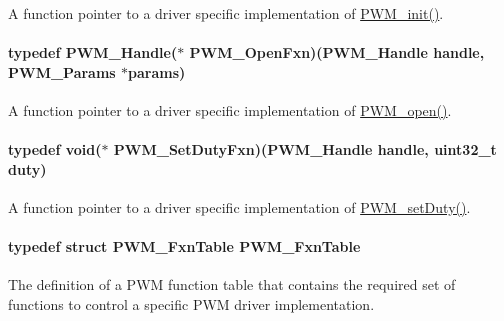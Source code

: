 A function pointer to a driver specific implementation of \hyperlink{_p_w_m_8h_aadae3fe77e36cbf9643a22eeb99fb01e}{P\-W\-M\-\_\-init()}. 

\paragraph[{P\-W\-M\-\_\-\-Open\-Fxn}]{\setlength{\rightskip}{0pt plus 5cm}typedef {\bf P\-W\-M\-\_\-\-Handle}($\ast$ P\-W\-M\-\_\-\-Open\-Fxn)({\bf P\-W\-M\-\_\-\-Handle} handle, {\bf P\-W\-M\-\_\-\-Params} $\ast$params)}\label{_p_w_m_8h_a9b5584df6c245da07aa971b217729cf1}


A function pointer to a driver specific implementation of \hyperlink{_p_w_m_8h_ac963beab0c5c6901bf852f175028aeaf}{P\-W\-M\-\_\-open()}. 

\paragraph[{P\-W\-M\-\_\-\-Set\-Duty\-Fxn}]{\setlength{\rightskip}{0pt plus 5cm}typedef void($\ast$ P\-W\-M\-\_\-\-Set\-Duty\-Fxn)({\bf P\-W\-M\-\_\-\-Handle} handle, uint32\-\_\-t duty)}\label{_p_w_m_8h_ad6ff34d4a9e084d7c4edee8c7a1a29a1}


A function pointer to a driver specific implementation of \hyperlink{_p_w_m_8h_a9b4c4b744af933d4f2678dc18b49bfb4}{P\-W\-M\-\_\-set\-Duty()}. 

\paragraph[{P\-W\-M\-\_\-\-Fxn\-Table}]{\setlength{\rightskip}{0pt plus 5cm}typedef struct {\bf P\-W\-M\-\_\-\-Fxn\-Table}  {\bf P\-W\-M\-\_\-\-Fxn\-Table}}\label{_p_w_m_8h_a05890cc4f17c4343ff0ee612561fe267}


The definition of a P\-W\-M function table that contains the required set of functions to control a specific P\-W\-M driver implementation. 

